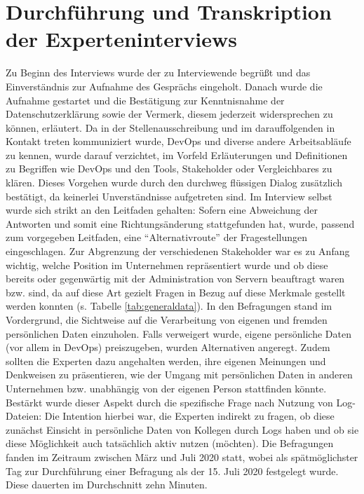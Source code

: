 \section{Durchführung und Transkription der Experteninterviews}
Zu Beginn des Interviews wurde der zu Interviewende begrüßt und das Einverständnis zur Aufnahme des Gesprächs eingeholt. Danach wurde die Aufnahme gestartet und die Bestätigung zur Kenntnisnahme der Datenschutzerklärung 
sowie der Vermerk, diesem jederzeit widersprechen zu können, erläutert. Da in der Stellenausschreibung und im darauffolgenden in Kontakt treten kommuniziert wurde, DevOps und diverse andere Arbeitsabläufe zu kennen, wurde 
darauf verzichtet, im Vorfeld Erläuterungen und Definitionen zu Begriffen wie DevOps und den Tools, Stakeholder oder Vergleichbares zu klären. Dieses Vorgehen wurde durch den durchweg flüssigen Dialog zusätzlich bestätigt, da keinerlei Unverständnisse aufgetreten sind.
Im Interview selbst wurde sich strikt an den Leitfaden gehalten: Sofern eine Abweichung der Antworten und somit eine Richtungsänderung stattgefunden hat, wurde, passend zum vorgegeben Leitfaden, eine \enquote{Alternativroute}
der Fragestellungen eingeschlagen. \newline \newline
Zur Abgrenzung der verschiedenen Stakeholder war es zu Anfang wichtig, welche Position im Unternehmen repräsentiert wurde und ob diese bereits oder gegenwärtig mit der Administration
von Servern beauftragt waren bzw. sind, da auf diese Art gezielt Fragen in Bezug auf diese Merkmale gestellt werden konnten (s. Tabelle \ref{tab:generaldata}). In den Befragungen stand im Vordergrund, die Sichtweise auf die Verarbeitung von eigenen und fremden
persönlichen Daten einzuholen. Falls verweigert wurde, eigene persönliche Daten (vor allem in DevOps) preiszugeben, wurden Alternativen angeregt. Zudem sollten die Experten dazu angehalten werden, ihre eigenen Meinungen und Denkweisen
zu präsentieren, wie der Umgang mit persönlichen Daten in anderen Unternehmen bzw. unabhängig von der eigenen Person stattfinden könnte. Bestärkt wurde dieser Aspekt durch die spezifische Frage nach Nutzung von Log-Dateien: Die Intention
hierbei war, die Experten indirekt zu fragen, ob diese zunächst Einsicht in persönliche Daten von Kollegen durch Logs haben und ob sie diese Möglichkeit auch tatsächlich aktiv nutzen (möchten). 
\newline \newline
Die Befragungen fanden im Zeitraum zwischen März und Juli 2020 statt, wobei als spätmöglichster Tag zur Durchführung einer Befragung als der 15. Juli 2020 festgelegt wurde. Diese dauerten im Durchschnitt zehn Minuten. 
